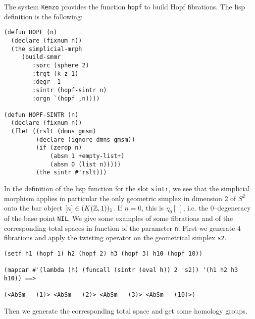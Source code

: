 \newpage
The system {\tt Kenzo} provides the function {\tt hopf} to build
Hopf fibrations. The lisp definition is the following:
{\footnotesize\begin{verbatim}
(defun HOPF (n)
  (declare (fixnum n))
  (the simplicial-mrph
     (build-smmr
        :sorc (sphere 2)
        :trgt (k-z-1)
        :degr -1
        :sintr (hopf-sintr n)
        :orgn `(hopf ,n))))

(defun HOPF-SINTR (n)
  (declare (fixnum n))
  (flet ((rslt (dmns gmsm)
         (declare (ignore dmns gmsm))
         (if (zerop n)
             (absm 1 +empty-list+)
             (absm 0 (list n)))))
         (the sintr #'rslt)))
\end{verbatim}}
In the definition of the lisp function for the slot {\tt sintr}, we see that the simplicial morphism
applies in particular the only geometric simplex in dimension $2$ of $S^2$ onto the bar object
$[n] \in (K({\mathbb{Z}},1))_1$. If $n=0$, this is $\eta_0 [\ ]$, i.e. the $0$--degeneracy of the base point
{\tt NIL}. We give some examples of some fibrations and of the corresponding total spaces in function of the
parameter {\tt n}. First we generate $4$ fibrations and apply the twisting operator
on the geometrical simplex {\tt s2}.
{\footnotesize\begin{verbatim}
(setf h1 (hopf 1) h2 (hopf 2) h3 (hopf 3) h10 (hopf 10))

(mapcar #'(lambda (h) (funcall (sintr (eval h)) 2 's2)) '(h1 h2 h3 h10)) ==>

(<AbSm - (1)> <AbSm - (2)> <AbSm - (3)> <AbSm - (10)>)
\end{verbatim}}
Then we generate the corresponding total space and get some homology groups.
